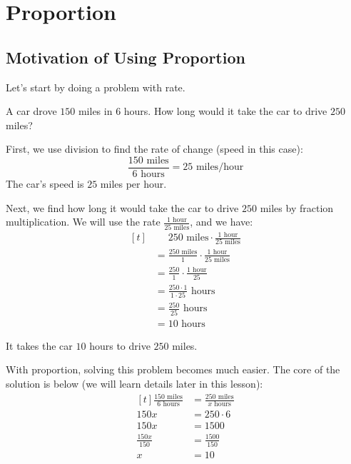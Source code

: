 
\section{Proportion}

\subsection{Motivation of Using Proportion}
Let's start by doing a problem with rate.

\begin{myexample}
A car drove $150$ miles in $6$ hours. How long would it take the car to drive $250$ miles?
\end{myexample}
\begin{solution}
First, we use division to find the rate of change (speed in this case):
\[ \frac{150 \text{ miles}}{6 \text{ hours}}=25 \text{ miles/hour} \]
The car's speed is $25$ miles per hour.

Next, we find how long it would take the car to drive $250$ miles by fraction multiplication. We will use the rate $\frac{1 \text{ hour}}{25 \text{ miles}}$, and we have:
\[
\begin{aligned}[t]
	&\phantom{{}=}250 \text{ miles} \cdot \frac{1 \text{ hour}}{25 \text{ miles}} \\
	&= \frac{250 \text{ miles}}{1} \cdot \frac{1 \text{ hour}}{25 \text{ miles}} \\
	&= \frac{250}{1} \cdot \frac{1 \text{ hour}}{25} \\
	&= \frac{250 \cdot 1}{1 \cdot 25} \text{ hours} \\
	&= \frac{250}{25} \text{ hours} \\
	&= 10 \text{ hours}
\end{aligned}
\]

It takes the car $10$ hours to drive $250$ miles.
\end{solution}

With proportion, solving this problem becomes much easier. The core of the solution is below (we will learn details later in this lesson):
\[
\begin{aligned}[t]
	\frac{150 \text{ miles}}{6 \text{ hours}} &= \frac{250 \text{ miles}}{x \text{ hours}} \\
	150x &= 250 \cdot 6 \\
	150x &= 1500 \\
	\frac{150x}{150} &= \frac{1500}{150} \\
	x &= 10
\end{aligned}
\]

